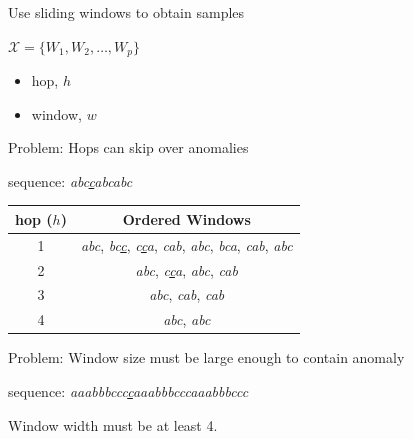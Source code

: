 \documentclass{beamer}
\begin{document}
  \begin{frame}{Use sliding windows to obtain samples}
    
    \begin{center}
    $\mathcal{X}=\{W_1,W_2,\ldots,W_p\}$
    \end{center}

    \begin{itemize}
      \item hop, $h$
      \item window, $w$ %
    \end{itemize}

  \end{frame}


  \begin{frame}{Problem: Hops can skip over anomalies}

    \begin{center} 
     sequence: \emph{abc\underline{c}abcabc} 

      \begin{tabular}{|c|c|}
        \hline
        hop ($h$) & Ordered Windows \\
        \hline
        \hline
        1 & \emph{abc},
            \emph{bc\underline{c}}, 
            \emph{c\underline{c}a}, 
            \emph{cab},
            \emph{abc}, 
            \emph{bca},
            \emph{cab},
            \emph{abc} \\
        \hline
        2 & \emph{abc},
            \emph{c\underline{c}a},
            \emph{abc},
            \emph{cab} \\
        \hline
        3 & \emph{abc}, 
            \emph{cab},
            \emph{cab} \\
        \hline
        4 & \emph{abc}, 
            \emph{abc} \\
        \hline
      \end{tabular}

    \end{center}
    
  \end{frame}


  \begin{frame}{Problem: Window size must be large enough to contain anomaly}

    \begin{center}
      sequence:
      \emph{aaabbbccc\underline{c}aaabbbcccaaabbbccc}
    \end{center}

    Window width must be at least 4.

  \end{frame}
\end{document}
